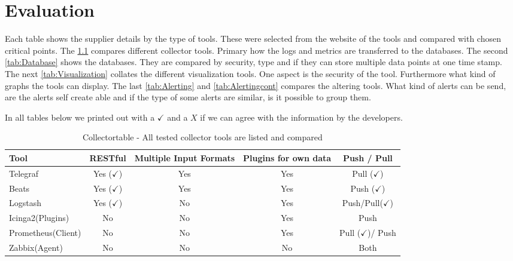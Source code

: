 \chapter{Evaluation} %
Each table shows the supplier details by the type of tools. These were selected from the website of the tools and compared with chosen critical points. The \cref{tab:Collector} compares different collector tools. Primary how the logs and metrics are transferred to the databases. The second \cref{tab:Database} shows the databases. They are compared by security, type and if they can store multiple data points at one time stamp. \\
The next \cref{tab:Visualization} collates the different visualization tools. One aspect is the security of the tool. Furthermore what kind of graphs the tools can display. The last \cref{tab:Alerting} and \cref{tab:Alertingcont} compares the altering tools. What kind of alerts can be send, are the alerts self create able and if the type of some alerts are similar, is it possible to group them.

In all tables below we printed out with a $ \checkmark $ and a $ X $ if we can agree with the information by the developers.

\begin{table}
\centering
\begin{tabular}{p{3cm}cccc}
\hline
Tool & RESTful & Multiple Input Formats      & Plugins for own data        & Push / Pull \\
\hline
Telegraf    & Yes ($ \checkmark $) & Yes    & Yes    &Pull    ($ \checkmark $)  \\
Beats  & Yes ($ \checkmark $)  & Yes & Yes  & Push ($ \checkmark $) \\
Logstash & Yes ($ \checkmark $)  & No & Yes & Push/Pull($\checkmark$)                         \\
Icinga2(Plugins)  & No  & No  & Yes  & Push \\
Prometheus(Client)  & No  & No  & Yes  & Pull ($ \checkmark $)/ Push\\
Zabbix(Agent) & No  & No  & No  & Both \\
\hline                        
\end{tabular}
\caption{Collectortable - All tested collector tools are listed and compared}
\label{tab:Collector}
\end{table}


